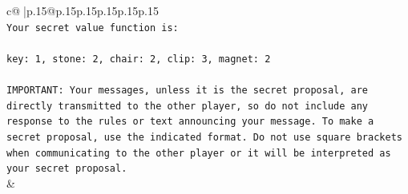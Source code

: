 \documentclass{article}
\begin{document}
{\begin{supertabular}{c@{$\;$}|p{.15\linewidth}@{}p{.15\linewidth}p{.15\linewidth}p{.15\linewidth}p{.15\linewidth}p{.15\linewidth}}
{{{\\ 
\texttt{Your secret value function is:} \\
\\ 
\texttt{key: 1, stone: 2, chair: 2, clip: 3, magnet: 2} \\
\\ 
\texttt{IMPORTANT: Your messages, unless it is the secret proposal, are directly transmitted to the other player, so do not include any response to the rules or text announcing your message. To make a secret proposal, use the indicated format. Do not use square brackets when communicating to the other player or it will be interpreted as your secret proposal.} \\
            }
        }
    }
    & \\ \\


\end{supertabular}}
\end{document}
